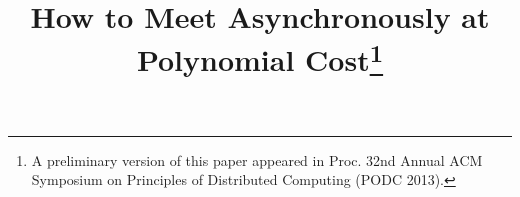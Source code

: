 \documentclass [11pt] {article}
\begin{document}
\newtheorem{theorem}{Theorem}[section]
\newtheorem{lemma}{Lemma}[section]
\newtheorem{corollary}{Corollary}[section]
\newtheorem{claim}{Claim}[section]
\newtheorem{proposition}{Proposition}[section]
\newtheorem{definition}{Definition}[section]
\newtheorem{fact}{Fact}[section]
\newtheorem{example}{Example}[section]





\newcommand{\cA}{{\cal A}}
\newcommand{\cP}{{\cal P}}
\newcommand{\cC}{{\cal C}}
\newcommand{\cG}{{\cal G}}
\newcommand{\cN}{{\cal N}}
\newcommand{\cU}{{\cal U}}
\newcommand{\cT}{{\cal T}}
\newcommand{\cS}{{\cal S}}
\newcommand{\cL}{{\cal L}}
\newcommand{\cV}{{\cal V}}
\newcommand{\loc}{{\cal LOCAL}}
\newcommand{\cM}{{\cal M}}


\newcommand{\f}[4][0pt]{\begin{list}{#2}{\setlength{\leftmargin}{#3 em}\addtolength{\leftmargin}{#3 em}\addtolength{\leftmargin}{1 em}\setlength{\labelsep}{#3 em}\addtolength{\labelsep}{#3 em}
 \setlength{\labelwidth}{20pt}
 \if!#1!\else\addtolength{\leftmargin}{#1}\fi \setlength{\topsep}{2pt}\setlength{\partopsep}{0pt}\if!#1!\else\setlength{\itemindent}{-#1}\fi }\item  #4\end{list}}

\newcommand{\qed}{\hfill  \smallbreak}
\newenvironment{proof}[1][Proof]
{\par\noindent{\bf #1:} }{\hspace*{\fill}\nolinebreak{}\bigskip\par}

\newcommand{\view}{\mathcal{V}}
\newcommand{\agent}{\lambda}
\newcommand{\lab}{\alpha}
\newcommand{\labels}{\mathcal{L}}
\newcommand{\lista}{\mathcal{Q}}
\newcommand{\code}{\xi}
\newcommand{\home}{h}
\newcommand{\routebegin}{b}
\newcommand{\routeend}{d}
\newcommand{\cR}{\mathcal{R}}
\newcommand{\hist}{\mathcal{H}}
\newcommand{\cQ}{\mathcal{Q}}

\newcommand{\ints}{\mathbb{N}}
\newcommand{\algorithmCL}{{\tt Choose\textup{-}Leader}}
\newcommand{\algorithmUL}{{\tt Update\textup{-}Label}}
\newcommand{\algorithmLE}{{\tt Leader\textup{-}Election}}
\newcommand{\algorithmInit}{{\tt Initialization}}

\newcommand{\last}{\textup{last}}
\newcommand{\depth}{3(n-1)}
\newcommand{\len}{\ell}
\newcommand{\conditionEC}{\textup{EC}}





\title{{\bf  How to Meet Asynchronously at Polynomial Cost}\thanks{A preliminary version of this paper appeared in
Proc. 32nd Annual ACM Symposium on Principles of Distributed Computing (PODC 2013).} }
\end{document}
